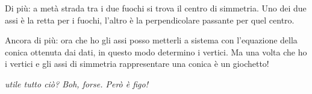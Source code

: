 \documentclass[a4paper, oneside]{article}
\begin{document}
			Di più: a metà strada tra i due fuochi si trova il centro di simmetria. Uno dei due assi è la retta per i fuochi, l'altro è la perpendicolare passante per quel centro. 
			
			Ancora di più: ora che ho gli assi posso metterli a sistema con l'equazione della conica ottenuta dai dati, in questo modo determino i vertici. Ma una volta che ho i vertici e gli assi di simmetria rappresentare una conica è un giochetto! \par
			\vspace{18pt}
			\begin{center}
				\emph{\Egrave utile tutto ciò? Boh, forse. Però è figo!}
			\end{center}
\end{document}
